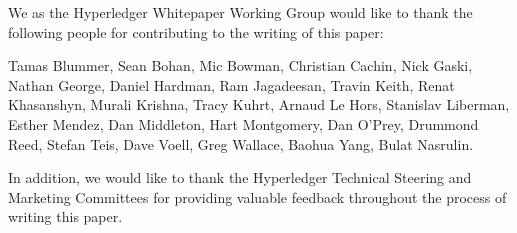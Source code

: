 We as the Hyperledger Whitepaper Working Group would like to thank the following people for contributing to the writing of this paper:

Tamas Blummer, Sean Bohan, Mic Bowman, Christian Cachin, Nick Gaski, Nathan George, Daniel Hardman, Ram Jagadeesan, Travin Keith, Renat Khasanshyn, Murali Krishna, Tracy Kuhrt, Arnaud Le Hors, Stanislav Liberman, Esther Mendez, Dan Middleton, Hart Montgomery, Dan O'Prey, Drummond Reed, Stefan Teis, Dave Voell, Greg Wallace, Baohua Yang, Bulat Nasrulin.


In addition, we would like to thank the Hyperledger Technical Steering and Marketing Committees for providing valuable feedback throughout the process of writing this paper.

